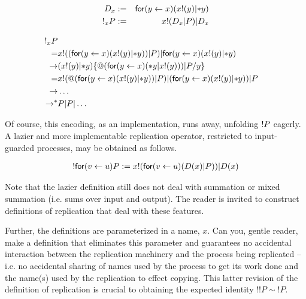 \begin{eqnarray}
	D_{x} & := & \prefix{x}{y}{(\binpar{\outputp{x}{y}}{\dropn{y}})} \nonumber\\
	\bangp_{x}{P} & := & \binpar{\lift{x}{\binpar{D_{x}}{P}}}{D_{x}} \nonumber
\end{eqnarray}

\begin{eqnarray}
	\bangp_{x}{P} & & \nonumber\\
	=
	& \lift{x}{(\prefix{x}{y}{(\outputp{x}{y} | \dropn{y})) | P}} 
	      | \prefix{x}{y}{(\outputp{x}{y} | \dropn{y})} & \nonumber\\
	\red
	& (\outputp{x}{y} | \dropn{y})\substn{\quotep{(\prefix{x}{y}{(\dropn{y} | \outputp{x}{y})) | P}}}{y} & \nonumber\\
	=
	& \outputp{x}{\quotep{(\prefix{x}{y}{(\outputp{x}{y} | \dropn{y})) | P}}}
	  | {(\prefix{x}{y}{(\outputp{x}{y} | \dropn{y})) | P}} & \nonumber\\
	\red
	& \ldots & \nonumber\\
	\red^*
	& P | P | \ldots & \nonumber
\end{eqnarray}

Of course, this encoding, as an implementation, runs away, unfolding
$\bangp{P}$ eagerly. A lazier and more implementable replication
operator, restricted to input-guarded processes, may be obtained as follows.

\begin{eqnarray}
\bangp{\prefix{u}{v}{P}} 
	:= 
	\binpar{\lift{x}{\prefix{u}{v}{(\binpar{D(x)}{P})}}}{D(x)} \nonumber
\end{eqnarray}

\begin{remark}
  Note that the lazier definition still does not deal with summation
  or mixed summation (i.e. sums over input and output). The reader is
  invited to construct definitions of replication that deal with these
  features. 

  Further, the definitions are parameterized in a name, $x$. Can you,
  gentle reader, make a definition that eliminates this parameter and
  guarantees no accidental interaction between the replication
  machinery and the process being replicated -- i.e. no accidental
  sharing of names used by the process to get its work done and the
  name(s) used by the replication to effect copying. This latter
  revision of the definition of replication is crucial to obtaining
  the expected identity $!!P \sim !P$.
\end{remark}

